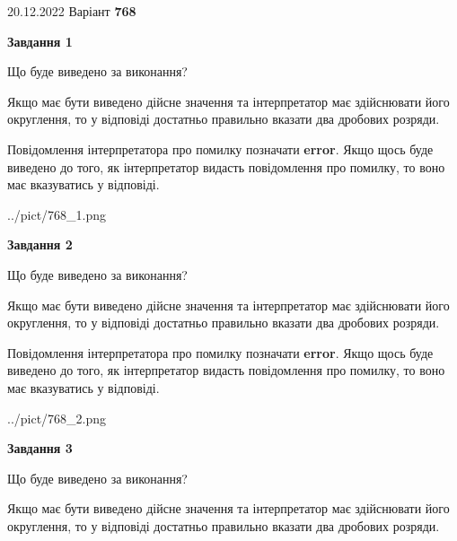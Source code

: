 \documentclass[12pt, ukrainian]{article}
\begin{document}
{20.12.2022 Варіант \No \textbf { 768 }\par}
{
\begin {Large}

{\begin {center}\textbf{Завдання 1}\end {center}}\par
Що буде виведено за виконання? \par

Якщо має бути виведено дійсне значення та інтерпретатор має здійснювати його округлення, 
то у відповіді достатньо правильно вказати два дробових розряди.

Повідомлення інтерпретатора про помилку позначати \textbf{error}.
Якщо щось буде виведено до того, як інтерпретатор видасть повідомлення про помилку, 
то воно має вказуватись у відповіді. \par

\begin{center}
	{../pict/768_1.png}
\end{center}
\newpage

{\begin {center}\textbf{Завдання 2}\end {center}}\par
Що буде виведено за виконання? \par

Якщо має бути виведено дійсне значення та інтерпретатор має здійснювати його округлення, 
то у відповіді достатньо правильно вказати два дробових розряди.

Повідомлення інтерпретатора про помилку позначати \textbf{error}.
Якщо щось буде виведено до того, як інтерпретатор видасть повідомлення про помилку, 
то воно має вказуватись у відповіді. \par

\begin{center}
	{../pict/768_2.png}
\end{center}
\newpage

{\begin {center}\textbf{Завдання 3}\end {center}}\par
Що буде виведено за виконання? \par

Якщо має бути виведено дійсне значення та інтерпретатор має здійснювати його округлення, 
то у відповіді достатньо правильно вказати два дробових розряди.


\end{Large}}
\end{document}
